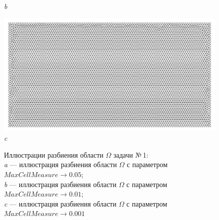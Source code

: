 \documentclass[12pt, a4paper]{article}
\begin{document}
\begin{figure}[h]
\begin{center}
{\begin{minipage}{0.45\textwidth}
								\textit{b} 
							\end{minipage}                                 
						} 
						{ 
							\begin{minipage}{0.9\textwidth} 
								\centering 
								\includegraphics[width=1\columnwidth]{rect_dirichlet_only_0001_calfem_net.pdf}\\ 
								\textit{c} 
							\end{minipage}                                 
						} 						
					\end{center} 
					\vspace*{-0.0mm} 
					\caption{Иллюстрации разбиения области $\Omega$ задачи №\,1:\\
						\textit{a} --- иллюстрация разбиения области $\Omega$ с параметром $MaxCellMeasure \rightarrow 0.05$; \\
						\textit{b} --- иллюстрация разбиения области $\Omega$ с параметром $MaxCellMeasure
						\rightarrow  0.01$; \\
						\textit{c} --- иллюстрация разбиения области $\Omega$ с параметром $MaxCellMeasure \rightarrow 0.001$
					} 
				\end{figure}
			
			\noindent
			
			\newpage
			
\end{document}
